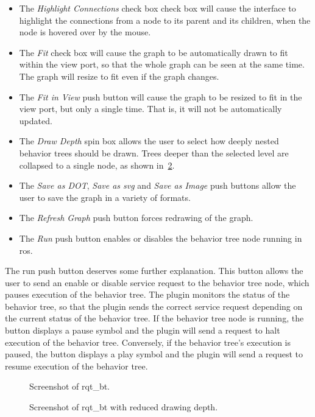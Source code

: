 \documentclass[\rootfolder/main.tex]{subfiles}
\begin{document}
\begin{itemize}
\item The \emph{Highlight Connections} check box check box will cause the interface to highlight the connections from a node to its parent and its children, when the node is hovered over by the mouse.
\item The \emph{Fit} check box will cause the graph to be automatically drawn to fit within the view port, so that the whole graph can be seen at the same time. The graph will resize to fit even if the graph changes.
\item The \emph{Fit in View} push button will cause the graph to be resized to fit in the view port, but only a single time. That is, it will not be automatically updated.
\item The \emph{Draw Depth} spin box allows the user to select how deeply nested behavior trees should be drawn. Trees deeper than the selected level are collapsed to a single node, as shown in~\cref{fig:rqt-bt-depth}.
\item The \emph{Save as DOT}, \emph{Save as \acrshort{svg}} and \emph{Save as Image} push buttons allow the user to save the graph in a variety of formats.
\item The \emph{Refresh Graph} push button forces redrawing of the graph.
\item The \emph{Run} push button enables or disables the behavior tree node running in \acrshort{ros}.
\end{itemize}

The run push button deserves some further explanation.
This button allows the user to send an enable or disable service request to the behavior tree node, which pauses execution of the behavior tree.
The plugin monitors the status of the behavior tree, so that the plugin sends the correct service request depending on the current status of the behavior tree.
If the behavior tree node is running, the button displays a pause symbol and the plugin will send a request to halt execution of the behavior tree.
Conversely, if the behavior tree's execution is paused, the button displays a play symbol and the plugin will send a request to resume execution of the behavior tree.

\begin{figure}[ht]
    \caption{Screenshot of rqt\_bt.}
    \label{fig:rqt-bt}
\end{figure}

\begin{figure}[ht]
    \caption{Screenshot of rqt\_bt with reduced drawing depth.}
    \label{fig:rqt-bt-depth}
\end{figure}
\end{document}
